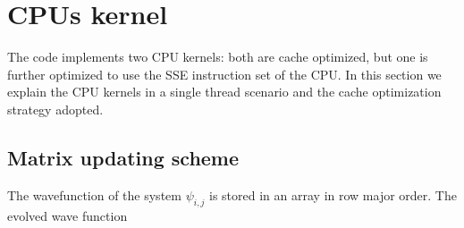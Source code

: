 
\section{CPUs kernel}
The code implements two CPU kernels: both are  cache optimized, but one is further optimized to use the SSE instruction set of the CPU. In this section we explain the CPU kernels in a single thread scenario and the cache optimization strategy adopted.

\subsection{Matrix updating scheme}
The wavefunction of the system $\psi_{i,j}$ is stored in an array in row major order. The evolved wave function